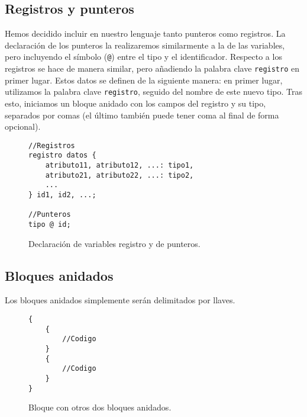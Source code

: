\subsection*{Registros y punteros}
Hemos decidido incluir en nuestro lenguaje tanto punteros como registros. La
declaración de los punteros la realizaremos similarmente a la de las variables,
pero incluyendo el símbolo (\lstinline{@}) entre el tipo y el identificador. Respecto a los
registros se hace de manera similar, pero añadiendo la palabra clave
\lstinline{registro} en primer lugar. Estos datos se definen de la siguiente
manera: en primer lugar, utilizamos la palabra clave \lstinline{registro},
seguido del nombre de este nuevo tipo. Tras esto, iniciamos un bloque anidado
con los campos del registro y su tipo, separados por comas (el último también
puede tener coma al final de forma opcional).
\begin{figure}[H]
    \centering
    \begin{lstlisting}
//Registros
registro datos {
    atributo11, atributo12, ...: tipo1,
    atributo21, atributo22, ...: tipo2,
    ...
} id1, id2, ...;

//Punteros
tipo @ id;
    \end{lstlisting}
    \caption{Declaración de variables registro y de punteros.}
\end{figure}

\subsection*{Bloques anidados}
Los bloques anidados simplemente serán delimitados por llaves.
\begin{figure}[H]
    \centering
    \begin{lstlisting}
{
    {
        //Codigo
    }
    {
        //Codigo
    }
}
    \end{lstlisting}
    \caption{Bloque con otros dos bloques anidados.}
\end{figure}

